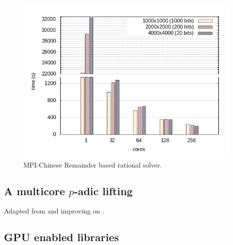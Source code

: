 \begin{figure}[htb]
\begin{center}
  \includegraphics[width=.7\textwidth]{nodes_histogram}
\end{center}
\caption{MPI-Chinese Remainder based rational solver.}\label{fig:mpi_histo}
\end{figure}
\subsection{A multicore $p$-adic lifting}

Adapted from and improving on \cite{ChSt05}.

\subsection{GPU enabled libraries}





